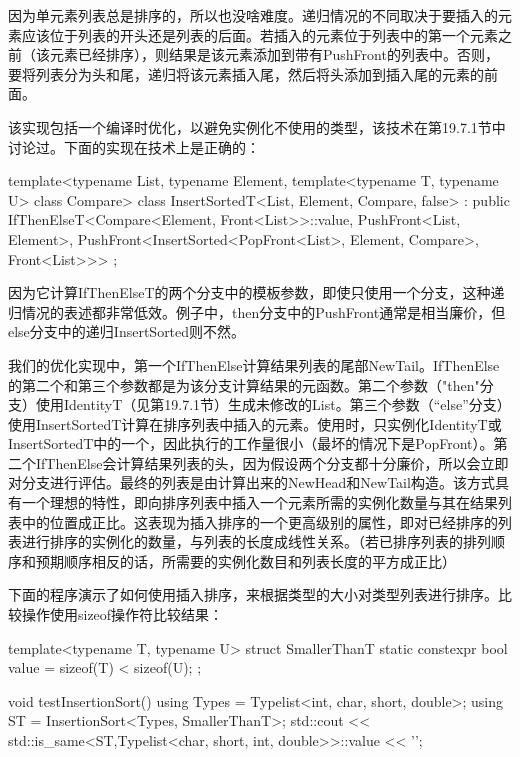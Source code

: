 因为单元素列表总是排序的，所以也没啥难度。递归情况的不同取决于要插入的元素应该位于列表的开头还是列表的后面。若插入的元素位于列表中的第一个元素之前（该元素已经排序），则结果是该元素添加到带有PushFront的列表中。否则，要将列表分为头和尾，递归将该元素插入尾，然后将头添加到插入尾的元素的前面。

该实现包括一个编译时优化，以避免实例化不使用的类型，该技术在第19.7.1节中讨论过。下面的实现在技术上是正确的：

\begin{cpp}
template<typename List, typename Element,
		template<typename T, typename U> class Compare>
class InsertSortedT<List, Element, Compare, false>
: public IfThenElseT<Compare<Element, Front<List>>::value,
					PushFront<List, Element>,
					PushFront<InsertSorted<PopFront<List>,
											Element, Compare>,
							Front<List>>>
{
};
\end{cpp}

因为它计算IfThenElseT的两个分支中的模板参数，即使只使用一个分支，这种递归情况的表述都非常低效。例子中，then分支中的PushFront通常是相当廉价，但else分支中的递归InsertSorted则不然。

我们的优化实现中，第一个IfThenElse计算结果列表的尾部NewTail。IfThenElse的第二个和第三个参数都是为该分支计算结果的元函数。第二个参数（"then"分支）使用IdentityT（见第19.7.1节）生成未修改的List。第三个参数（“else”分支）使用InsertSortedT计算在排序列表中插入的元素。使用时，只实例化IdentityT或InsertSortedT中的一个，因此执行的工作量很小（最坏的情况下是PopFront）。第二个IfThenElse会计算结果列表的头，因为假设两个分支都十分廉价，所以会立即对分支进行评估。最终的列表是由计算出来的NewHead和NewTail构造。该方式具有一个理想的特性，即向排序列表中插入一个元素所需的实例化数量与其在结果列表中的位置成正比。这表现为插入排序的一个更高级别的属性，即对已经排序的列表进行排序的实例化的数量，与列表的长度成线性关系。（若已排序列表的排列顺序和预期顺序相反的话，所需要的实例化数目和列表长度的平方成正比）

下面的程序演示了如何使用插入排序，来根据类型的大小对类型列表进行排序。比较操作使用sizeof操作符比较结果：

\begin{cpp}
template<typename T, typename U>
struct SmallerThanT {
	static constexpr bool value = sizeof(T) < sizeof(U);
};

void testInsertionSort()
{
	using Types = Typelist<int, char, short, double>;
	using ST = InsertionSort<Types, SmallerThanT>;
	std::cout << std::is_same<ST,Typelist<char, short, int, double>>::value
			<< '\n';
}
\end{cpp}

























